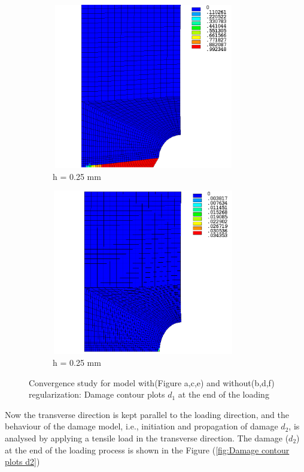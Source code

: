 \documentclass[12pt]{report}
\begin{document}
\begin{figure}[htbp!]\ContinuedFloat
     \begin{subfigure}{0.4\textwidth}
         \includegraphics[width=8cm,height=7.2cm,keepaspectratio]{25.d1-0.25-r.png}
         \caption{h = 0.25 mm}
         \label{fig:d1-0.25-r}
     \end{subfigure}
     \hspace{1.8cm}
     \begin{subfigure}{0.4\textwidth}
         \includegraphics[width=8cm,height=7.2cm,keepaspectratio]{25.d1-0.25-nr.png}
         \caption{h = 0.25 mm}
         \label{fig:d1-0.25-nr}
     \end{subfigure}     
        \caption{Convergence study for model with(Figure a,c,e) and without(b,d,f) regularization: Damage contour plots $d_{1}$ at the end of the loading}
        \label{fig:Convergence study for model with and without regularization}     
\end{figure}
\FloatBarrier
Now the transverse direction is kept parallel to the loading direction, and the behaviour of the damage model, i.e., initiation and propagation of damage $d_{2}$, is analysed by applying a tensile load in the transverse direction. The damage ($d_{2}$) at the end of the loading process is shown in the Figure (\ref{fig:Damage contour plots d2})
\end{document}
